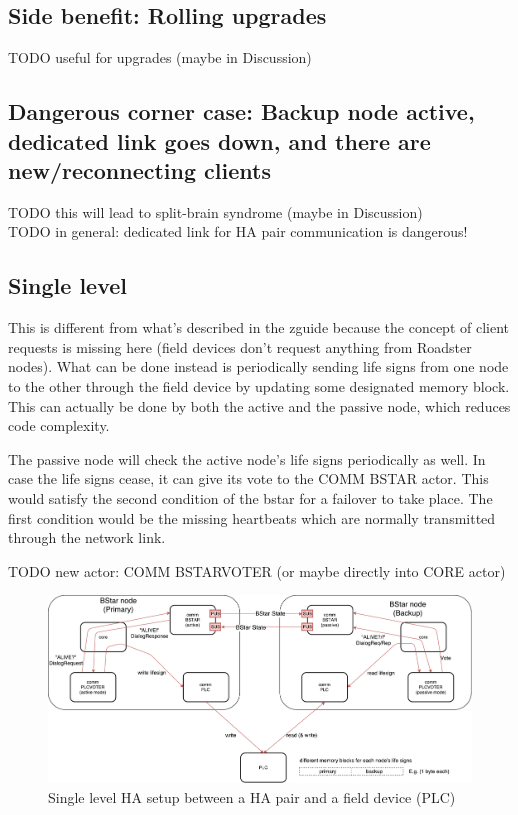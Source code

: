 \subsection{Side benefit: Rolling upgrades}
TODO useful for upgrades (maybe in Discussion)\\

\subsection{Dangerous corner case: Backup node active, dedicated link goes down, and there are new/reconnecting clients}
TODO this will lead to split-brain syndrome (maybe in Discussion)\\
TODO in general: dedicated link for HA pair communication is dangerous!\\

\subsection{Single level}
This is different from what's described in the \gls{zguide} because the concept of
client requests is missing here (field devices don't request anything from Roadster nodes).  What can be
done instead is periodically sending life signs from one node to the other
through the field device by updating some designated memory block. This can actually be
done by both the active and the passive node, which reduces code complexity.

The passive node will check the active node's life signs periodically as well.
In case the life signs cease, it can give its vote to the COMM BSTAR actor.
This would satisfy the second condition of the \gls{bstar} for a
failover to take place. The first condition would be the missing heartbeats
which are normally transmitted through the network link.

TODO new actor: COMM BSTARVOTER (or maybe directly into CORE actor)

\begin{figure}[]
	\includegraphics[width=\textwidth]{img/SL-HA_bstar.pdf}
	\caption{Single level HA setup between a HA pair and a field device (PLC)}
	\label{fig:sl-ha}
\end{figure}

